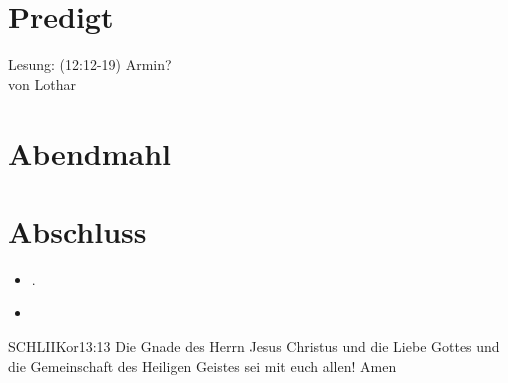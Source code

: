 \documentclass[fontsize=14pt]{mybib}
\newcommand{\Name}{Lothar}
\begin{document}
\section{Predigt}

    Lesung: (12:12-19) Armin?\\
    von \Name{}

\section{Abendmahl}

\section{Abschluss}
\begin{itemize}
    \item [] .
    \item [] 
\end{itemize}
\begin{bibelbox}{SCHL}{IIKor}{13:13}
    Die Gnade des Herrn Jesus Christus und die Liebe Gottes und die Gemeinschaft des Heiligen Geistes sei mit euch allen! Amen
\end{bibelbox}
\end{document}
